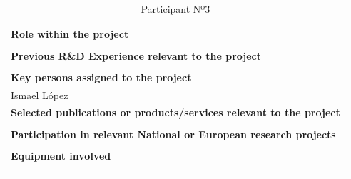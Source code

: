 \begin{longtable}[H]{|p{0.7cm}|p{4cm}|p{7cm}|p{1.3cm}|}
	\multicolumn{4}{|p{13cm}|}{\textbf{Role within the project}}   \\ \hline
	
	\multicolumn{4}{|p{13cm}|}{}  \\ \hline
	
	\multicolumn{4}{|p{13cm}|}{\textbf{Previous R\&D Experience relevant to the project}}  \\ \hline
	
	\multicolumn{4}{|p{13cm}|}{}  \\ \hline
	
	\multicolumn{4}{|p{13cm}|}{\textbf{Key persons assigned to the project}}   \\ \hline
	
	\multicolumn{4}{|p{13cm}|}{Ismael López}  \\ \hline
	
	\multicolumn{4}{|p{13cm}|}{\textbf{Selected publications or products/services relevant to the project}}  \\ \hline
	
	\multicolumn{4}{|p{13cm}|}{}  \\ \hline
	
	\multicolumn{4}{|p{13cm}|}{\textbf{Participation in relevant National or European research projects}}  \\ \hline
	
	\multicolumn{4}{|p{13cm}|}{}  \\ \hline
	
	\multicolumn{4}{|p{13cm}|}{\textbf{Equipment involved}}  \\ \hline
	
	\multicolumn{4}{|p{13cm}|}{}  \\ \hline
	\caption{Participant Nº3}
\end{longtable}

